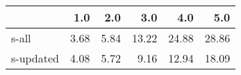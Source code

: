 \begin{tabular}{lrrrrr}
\toprule
{} &  1.0 &  2.0 &   3.0 &   4.0 &   5.0 \\
\midrule
s-all     & 3.68 & 5.84 & 13.22 & 24.88 & 28.86 \\
s-updated & 4.08 & 5.72 &  9.16 & 12.94 & 18.09 \\
\bottomrule
\end{tabular}
